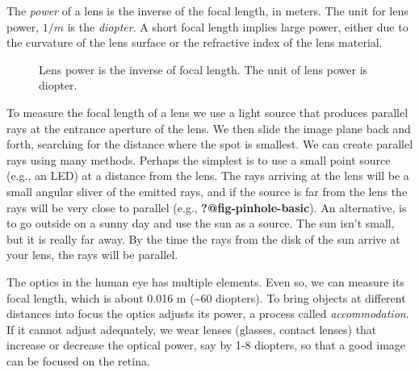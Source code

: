\documentclass[
  letterpaper,
]{book}
\begin{document}
The \emph{power} of a lens is the inverse of the focal length, in
meters. The unit for lens power, \(1/m\) is the \emph{diopter}. A short
focal length implies large power, either due to the curvature of the
lens surface or the refractive index of the lens material.

\begin{figure}


\caption{\label{fig-thinlens-power}Lens power is the inverse of focal
length. The unit of lens power is diopter.}

\end{figure}%

To measure the focal length of a lens we use a light source that
produces parallel rays at the entrance aperture of the lens. We then
slide the image plane back and forth, searching for the distance where
the spot is smallest. We can create parallel rays using many methods.
Perhaps the simplest is to use a small point source (e.g., an LED) at a
distance from the lens. The rays arriving at the lens will be a small
angular sliver of the emitted rays, and if the source is far from the
lens the rays will be very close to parallel (e.g.,
\textbf{?@fig-pinhole-basic}). An alternative, is to go outside on a
sunny day and use the sun as a source. The sun isn't small, but it is
really far away. By the time the rays from the disk of the sun arrive at
your lens, the rays will be parallel.

The optics in the human eye has multiple elements. Even so, we can
measure its focal length, which is about 0.016 m (\textasciitilde60
diopters). To bring objects at different distances into focus the optics
adjusts its power, a process called \emph{accommodation}. If it cannot
adjust adequately, we wear lenses (glasses, contact lenses) that
increase or decrease the optical power, say by 1-8 diopters, so that a
good image can be focused on the retina.
\end{document}
